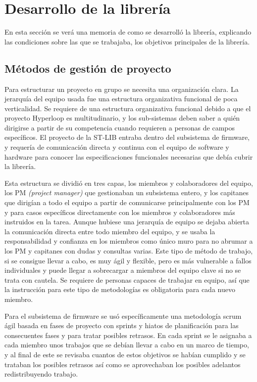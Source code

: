 \documentclass{report}
\begin{document}
\newpage

\section{Desarrollo de la librería}

En esta sección se verá una memoria de como se desarrolló la librería, explicando las condiciones sobre las que se trabajaba, los objetivos principales de la librería. \par


\subsection{Métodos de gestión de proyecto}
Para estructurar un proyecto en grupo se necesita una organización clara. La jerarquía del equipo usada fue una estructura organizativa funcional de poca verticalidad. Se requiere de una estructura organizativa funcional debido a que el proyecto Hyperloop es multitudinario, y los sub-sistemas deben saber a quién dirigirse a partir de su competencia cuando requieren a personas de campos específicos. El proyecto de la ST-LIB entraba dentro del subsistema de firmware, y requería de comunicación directa y continua con el equipo de software y hardware para conocer las especificaciones funcionales necesarias que debía cubrir la librería. \par\vspace{0.3 cm}
Esta estructura se dividió en tres capas, los miembros y colaboradores del equipo, los PM \textit{(project manager)} que gestionaban un subsistema entero, y los capitanes que dirigían a todo el equipo a partir de comunicarse principalmente con los PM y para casos específicos directamente con los miembros y colaboradores más instruidos en la tarea. Aunque hubiese una jerarquía de equipo se dejaba abierta la comunicación directa entre todo miembro del equipo, y se usaba la responsabilidad y confianza en los miembros como único muro para no abrumar a los PM y capitanes con dudas y consultas varias. Este tipo de método de trabajo, si se consigue llevar a cabo, es muy ágil y flexible, pero es más vulnerable a fallos individuales y puede llegar a sobrecargar a miembros del equipo clave si no se trata con cautela. Se requiere de personas capaces de trabajar en equipo, así que la instrucción para este tipo de metodologías es obligatoria para cada nuevo miembro. 
\par \vspace{0.3 cm}
Para el subsistema de firmware se usó específicamente una metodología scrum ágil basada en fases de proyecto con sprints y hiatos de planificación para las consecuentes fases y para tratar posibles retrasos. En cada sprint se le asignaba a cada miembro unos trabajos que se debían llevar a cabo en un marco de tiempo, y al final de este se revisaba cuantos de estos objetivos se habían cumplido y se trataban los posibles retrasos así como se aprovechaban los posibles adelantos redistribuyendo trabajo. \par \vspace{0.3 cm}
\end{document}
